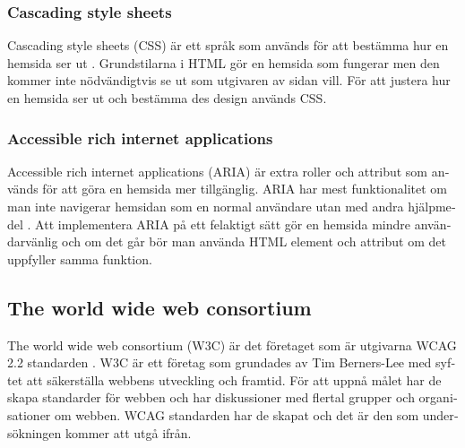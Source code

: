 \documentclass[11p]{article}
\begin{document}
\begin{otherlanguage}{swedish}

    \subsubsection{Cascading style sheets}
    Cascading style sheets (CSS) är ett språk som används för att bestämma hur en hemsida ser ut \parencite{CSS}.
    Grundstilarna i HTML gör en hemsida som fungerar men den kommer inte nödvändigtvis se ut som utgivaren av sidan vill.
    För att justera hur en hemsida ser ut och bestämma des design används CSS.

    \subsubsection{Accessible rich internet applications}
    Accessible rich internet applications (ARIA) är extra roller och attribut som används för att göra en hemsida mer tillgänglig.
    ARIA har mest funktionalitet om man inte navigerar hemsidan som en normal användare utan med andra hjälpmedel \parencite{ARIA}.
    Att implementera ARIA på ett felaktigt sätt gör en hemsida mindre användarvänlig och om det går bör man använda HTML element och attribut om det uppfyller samma funktion.
    
    \subsection{The world wide web consortium}
    The world wide web consortium (W3C) är det företaget som är utgivarna WCAG 2.2 standarden \parencite{W3C}.
    W3C är ett företag som grundades av Tim Berners-Lee med syftet att säkerställa webbens utveckling och framtid.
    För att uppnå målet har de skapa standarder för webben och har diskussioner med flertal grupper och organisationer om webben.
    WCAG standarden har de skapat och det är den som undersökningen kommer att utgå ifrån.


\end{otherlanguage}
\end{document}
